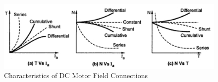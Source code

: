 \documentclass[10pt,a4paper]{article}
\begin{document}
\begin{figure}[!ht]
\centering
\includegraphics[scale=0.7]{char.jpeg} 
\caption{Characteristics of DC Motor Field Connections}
\label{fig:1}
\end{figure}
\end{document}
